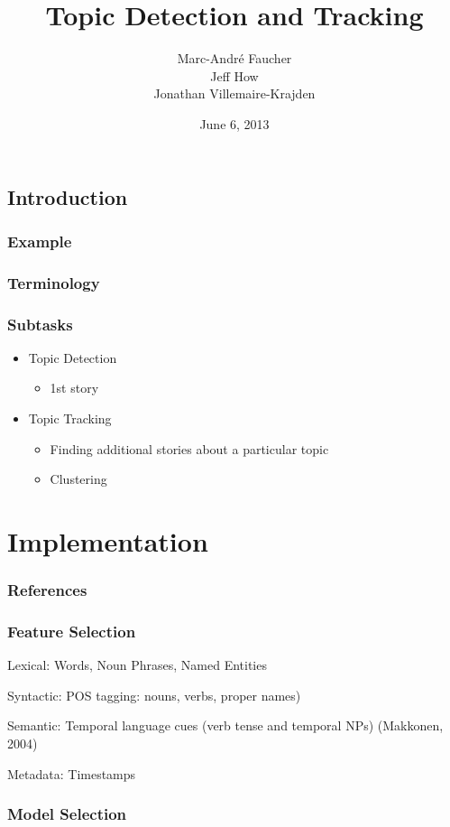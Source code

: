 \documentclass{beamer}
\title{Topic Detection and Tracking}
\author{
Marc-André Faucher\\
Jeff How\\
Jonathan Villemaire-Krajden}
\date{June 6, 2013}
\begin{document}
\begin{frame}[plain]
\section{Introduction}
\frametitle{Example}
\titlepage
\end{frame}

\begin{frame}[plain]
\frametitle{Terminology}
\end{frame}

\begin{frame}
\frametitle{Subtasks}
\begin{itemize}
\item Topic Detection
\begin{itemize}
\item 1st story
\end{itemize}
\item Topic Tracking
\begin{itemize}
\item Finding additional stories about a particular topic
\item Clustering
\end{itemize}
\end{itemize}
\end{frame}

\section{Implementation}
\begin{frame}
\frametitle{References}
\end{frame}

\begin{frame}
\frametitle{Feature Selection}
\item Lexical: Words, Noun Phrases, Named Entities
\item Syntactic: POS tagging: nouns, verbs, proper names)
\item Semantic: Temporal language cues (verb tense and temporal NPs) (Makkonen, 2004)
\item Metadata: Timestamps
\end{frame}

\begin{frame}
\frametitle{Model Selection}
\end{frame}
\end{document}
